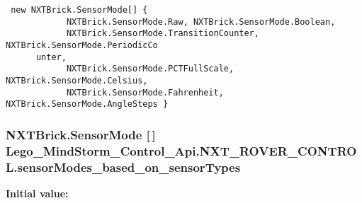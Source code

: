\begin{Code}\begin{verbatim} new NXTBrick.SensorMode[] {
            NXTBrick.SensorMode.Raw, NXTBrick.SensorMode.Boolean,
            NXTBrick.SensorMode.TransitionCounter, NXTBrick.SensorMode.PeriodicCo
      unter,
            NXTBrick.SensorMode.PCTFullScale, NXTBrick.SensorMode.Celsius,
            NXTBrick.SensorMode.Fahrenheit, NXTBrick.SensorMode.AngleSteps }
\end{verbatim}
\end{Code}
\hypertarget{class_lego___mind_storm___control___api_1_1_n_x_t___r_o_v_e_r___c_o_n_t_r_o_l_256595c0c0269d20153ba069f5184164}{
\subsubsection[{sensorModes\_\-based\_\-on\_\-sensorTypes}]{\setlength{\rightskip}{0pt plus 5cm}NXTBrick.SensorMode \mbox{[}$\,$\mbox{]} {\bf Lego\_\-MindStorm\_\-Control\_\-Api.NXT\_\-ROVER\_\-CONTROL.sensorModes\_\-based\_\-on\_\-sensorTypes}}}
\label{class_lego___mind_storm___control___api_1_1_n_x_t___r_o_v_e_r___c_o_n_t_r_o_l_256595c0c0269d20153ba069f5184164}


\textbf{Initial value:}

